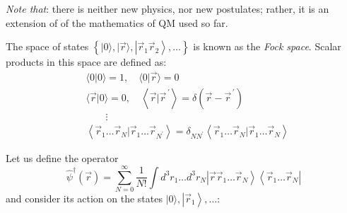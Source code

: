 \documentclass[12pt]{article}
\newcommand{\be}{\begin{equation}}
\newcommand{\ee}{\end{equation}}
\begin{document}
\emph{Note that}: there is neither new physics, nor new
postulates; rather, it is an extension of
of the mathematics of QM used so far.

The space of states $\left\{|0\rangle,|\vec{r}\rangle,\left|\vec{r}_{1} \vec{r}_{2}\right\rangle, \ldots\right\}$ is known
as the \emph{Fock space}. Scalar products in this space
are defined as:
\begin{align}
&\langle 0 | 0\rangle=1, 
\quad\langle 0 | \vec{r}\rangle=0\\
&\langle\vec{r} | 0\rangle=0,
\quad\left\langle\vec{r} | \vec{r}^{\,\prime}\right\rangle=\delta\left(\vec{r}-\vec{r}^{\,\prime}\right)\\
&\quad\quad\vdots\nonumber\\
&\left\langle\vec{r}_{1} \ldots \vec{r}_{N} | \vec{r}_{1} \ldots \vec{r}_{N^{\prime}}\right\rangle=\delta_{NN^{\prime}}\left\langle\vec{r}_{1} \ldots \vec{r}_{N} | \vec{r}_{1} \ldots \vec{r}_{N}\right\rangle\label{eq:g29}
\end{align}

Let us define the operator
\be
\hat{\psi}^{\dagger}(\vec{r})=\sum_{N=0}^{\infty} \frac{1}{N !} \int d^{3} r_{1} \ldots d^{3} r_{N}\left|\vec{r} \vec{r}_{1} \ldots \vec{r}_{N}\right\rangle\left\langle\vec{r}_{1} \ldots \vec{r}_{N}\right|
\label{eq:g30}
\ee
and consider its action on the states $|0\rangle,\left|\vec{r}_{1}\right\rangle, \ldots$:
\end{document}
